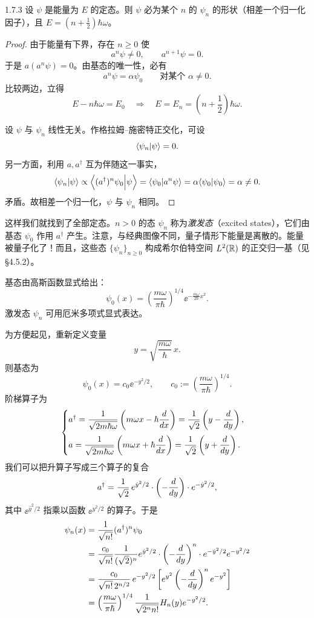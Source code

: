 \begin{proposition}{1.7.3}
  设 $\psi$ 是能量为 $E$ 的定态。则 $\psi$ 必为某个 $n$ 的 $\psi_n$ 的形状（相差一个归一化因子），且 $E=\left(n+\frac12\right)\hbar\omega$。
\end{proposition}

\begin{proof}
  由于能量有下界，存在 $n\ge 0$ 使
  \[
  a^n\psi\ne 0,\qquad a^{n+1}\psi=0.
  \]
  于是 $a(a^n\psi)=0$。由基态的唯一性，必有
  \[
  a^n\psi=\alpha\psi_0
  \qquad\text{对某个 }\alpha\ne 0.
  \]
  比较两边，立得
  \[
  E-n\hbar\omega=E_0
  \quad\Longrightarrow\quad
  E=E_n=\left(n+\frac12\right)\hbar\omega.
  \]

  设 $\psi$ 与 $\psi_n$ 线性无关。作格拉姆–施密特正交化，可设
  \[
  \langle \psi_n|\psi\rangle=0.
  \]
  另一方面，利用 $a,a^\dagger$ 互为伴随这一事实，
  \[
  \langle \psi_n|\psi\rangle
  \propto\left\langle(a^\dagger)^n\psi_0\Big|\psi\right\rangle
  =\langle\psi_0|a^n\psi\rangle
  =\alpha\langle \psi_0|\psi_0\rangle=\alpha\ne 0.
  \]
  矛盾。故相差一个归一化，$\psi$ 与 $\psi_n$ 相同。
\end{proof}

这样我们就找到了全部定态。$n>0$ 的态 $\psi_n$ 称为\emph{激发态}（excited states），它们由基态 $\psi_0$ 作用 $a^\dagger$ 产生。注意，与经典图像不同，量子情形下能量是离散的。能量被量子化了！而且，这些态 $\{\psi_n\}_{n\ge 0}$ 构成希尔伯特空间 $L^2(\mathbb{R})$ 的正交归一基（见 §4.5.2）。

基态由高斯函数显式给出：
\[
\psi_0(x)=\left(\frac{m\omega}{\pi\hbar}\right)^{1/4}\ee^{-\frac{m\omega}{2\hbar}x^2}.
\]
激发态 $\psi_n$ 可用厄米多项式显式表达。

为方便起见，重新定义变量
\[
y=\sqrt{\frac{m\omega}{\hbar}}\,x.
\]
则基态为
\[
\psi_0(x)=c_0\ee^{-y^2/2},
\qquad
c_0:=\left(\frac{m\omega}{\pi\hbar}\right)^{1/4}.
\]
阶梯算子为
\[
\begin{cases}
a^\dagger=\dfrac{1}{\sqrt{2m\hbar\omega}}\left(m\omega x-\hbar\dfrac{d}{d x}\right)
=\dfrac{1}{\sqrt2}\left(y-\dfrac{d}{d y}\right),\\[4mm]
a=\dfrac{1}{\sqrt{2m\hbar\omega}}\left(m\omega x+\hbar\dfrac{d}{d x}\right)
=\dfrac{1}{\sqrt2}\left(y+\dfrac{d}{d y}\right).
\end{cases}
\]
我们可以把升算子写成三个算子的复合
\[
a^\dagger=\frac{1}{\sqrt2}\,e^{\hat y^2/2}\cdot\left(-\frac{d}{d y}\right)\cdot e^{-\hat y^2/2},
\]
其中 $\ee^{\hat y^2/2}$ 指乘以函数 $\ee^{y^2/2}$ 的算子。于是
\[
\begin{aligned}
\psi_n(x)&=\frac{1}{\sqrt{n!}}(a^\dagger)^n\psi_0\\
&=\frac{c_0}{\sqrt{n!}}\frac{1}{(\sqrt2)^n}
e^{\hat y^2/2}\cdot\left(-\frac{d}{d y}\right)^n\cdot
e^{-\hat y^2/2}e^{-y^2/2}\\
&=\frac{c_0}{\sqrt{n!}\,2^{n/2}}\,e^{-y^2/2}
\left[e^{y^2}\left(-\frac{d}{d y}\right)^ne^{-y^2}\right]\\
&=\left(\frac{m\omega}{\pi\hbar}\right)^{1/4}\frac{1}{\sqrt{2^n n!}}H_n(y)e^{-y^2/2}.
\end{aligned}
\]

